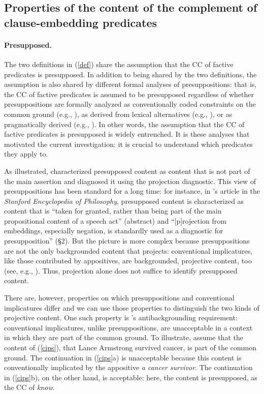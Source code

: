 \documentclass[11pt,fleqn]{article}
\newcommand{\6}{\mbox{$[\hspace*{-.6mm}[$}}
\newcommand{\9}{\mbox{$]\hspace*{-.6mm}]$}}
\newcommand{\citepos}[1]{\citeauthor{#1}'s \citeyear{#1}}
\begin{document}
\subsection{Properties of the content of the complement of clause-embedding predicates}\label{s12}
	
\paragraph{Presupposed.} The two definitions in (\ref{def}) share the assumption that the CC of factive predicates is presupposed. In addition to being shared by the two definitions, the assumption is also shared by different formal analyses of presuppositions: that is, the CC of factive predicates is assumed to be presupposed regardless of whether presuppositions are formally analyzed as conventionally coded constraints on the common ground (e.g., \citealt{heim83,vds92}), as derived from lexical alternatives (e.g., \citealt{abusch10, romoli2015}), or as pragmatically derived (e.g., \citealt{abrusan2011,best-question}). In other words, the assumption that the CC of factive predicates is presupposed is widely entrenched. It is these analyses that motivated the current investigation: it is crucial to understand which predicates they apply to.

As illustrated, \citealt{kiparsky-kiparsky70} characterized presupposed content as content that is not part of the main assertion and diagnosed it using the projection diagnostic. This view of presuppositions has been standard for a long time: for instance, in \citepos{beaver-geurts-sep} article in the {\em Stanford Encyclopedia of Philosophy}, presupposed content is characterized as content that is ``taken for granted, rather than being part of the main propositional content of a speech act'' (abstract) and ``[p]rojection from embeddings, especially negation, is standardly used as a diagnostic for presupposition'' (\S2). But the picture is more complex because presuppositions are not the only backgrounded content that projects: conventional implicatures, like those contributed by appositives, are backgrounded, projective content, too (see, e.g., \citealt{ccmg90,potts05}). Thus, projection alone does not suffice to identify presupposed content.

There are, however, properties on which presuppositions and conventional implicatures differ and we can use those properties to distinguish the two kinds of projective content. One such property is \citepos{potts05} antibackgrounding requirement: conventional implicatures, unlike presuppositions, are unacceptable in a context in which they are part of the common ground. To illustrate, assume that the content of (\ref{cips}), that Lance Armstrong survived cancer, is part of the common ground. The continuation in (\ref{cips}a) is unacceptable because this content is conventionally implicated by the appositive {\em a cancer survivor}. The continuation in (\ref{cips}b), on the other hand, is acceptable: here, the content is presupposed, as the CC of {\em know}. 
\end{document}
